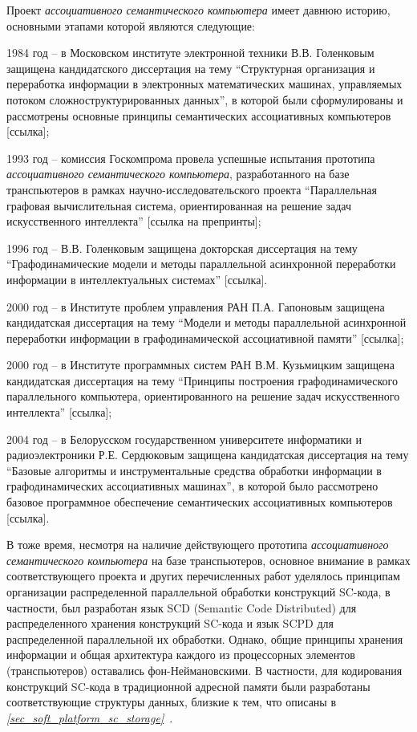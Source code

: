 Проект \textit{ассоциативного семантического компьютера} имеет давнюю историю, основными этапами которой являются следующие:
\begin{textitemize}
\item 1984 год -- в Московском  институте электронной техники В.В. Голенковым защищена кандидатского диссертация на тему ``Структурная организация и переработка информации в электронных математических машинах, управляемых потоком сложноструктурированных данных'', в которой были сформулированы и рассмотрены основные принципы семантических ассоциативных компьютеров [ссылка];
\item 1993 год -- комиссия Госкомпрома провела успешные испытания прототипа \textit{ассоциативного семантического компьютера}, разработанного на базе транспьютеров в рамках научно-исследовательского проекта ``Параллельная графовая вычислительная система, ориентированная на решение задач искусственного интеллекта'' [ссылка на препринты];
\item 1996 год -- В.В. Голенковым защищена докторская диссертация на тему ``Графодинамические модели и методы параллельной асинхронной переработки информации в интеллектуальных системах'' [ссылка]. 
\item 2000 год -- в Институте проблем управления РАН П.А. Гапоновым защищена кандидатская диссертация на тему ``Модели и методы параллельной асинхронной переработки информации в графодинамической ассоциативной памяти'' [ссылка];
\item 2000 год -- в Институте программных систем РАН В.М. Кузьмицким защищена кандидатская диссертация на тему ``Принципы построения графодинамического параллельного компьютера, ориентированного на решение задач искусственного интеллекта'' [ссылка];
\item 2004 год -- в Белорусском государственном университете информатики и радиоэлектроники Р.Е. Сердюковым защищена кандидатская диссертация на тему ``Базовые алгоритмы и инструментальные средства обработки информации в графодинамических ассоциативных машинах'', в которой было рассмотрено базовое программное обеспечение семантических ассоциативных компьютеров [ссылка].
\end{textitemize}

В тоже время, несмотря на наличие действующего прототипа \textit{ассоциативного семантического компьютера} на базе транспьютеров, основное внимание в рамках соответствующего проекта и других перечисленных работ уделялось принципам организации распределенной параллельной обработки конструкций SC-кода, в частности, был разработан язык SCD (Semantic Code Distributed) для распределенного хранения конструкций SC-кода и язык SCPD для распределенной параллельной их обработки. Однако, общие принципы хранения информации и общая архитектура каждого из процессорных элементов (транспьютеров) оставались фон-Неймановскими. В частности, для кодирования конструкций SC-кода в традиционной адресной памяти были разработаны соответствующие структуры данных, близкие к тем, что описаны в \textit{\ref{sec_soft_platform_sc_storage}~}.

